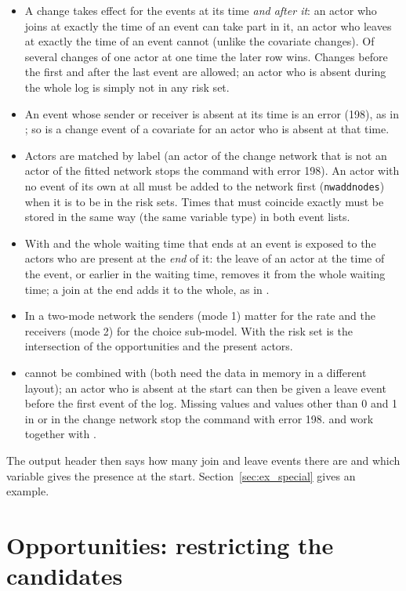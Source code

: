 \begin{itemize}[nosep]
  \item A change takes effect for the events at its time \emph{and after it}: an actor who joins at exactly the time of an event can take part in it, an actor who leaves at exactly the time of an event cannot (unlike the covariate changes). Of several changes of one actor at one time the later row wins. Changes before the first and after the last event are allowed; an actor who is absent during the whole log is simply not in any risk set.
  \item An event whose sender or receiver is absent at its time is an error (198), as in \goldfish{}; so is a change event of a covariate for an actor who is absent at that time.
  \item Actors are matched by label (an actor of the change network that is not an actor of the fitted network stops the command with error 198). An actor with no event of its own at all must be added to the network first (\texttt{nwaddnodes}) when it is to be in the risk sets. Times that must coincide exactly must be stored in the same way (the same variable type) in both event lists.
  \item With  and  the whole waiting time that ends at an event is exposed to the actors who are present at the \emph{end} of it: the leave of an actor at the time of the event, or earlier in the waiting time, removes it from the whole waiting time; a join at the end adds it to the whole, as in \goldfish{}.
  \item In a two-mode network the senders (mode 1) matter for the rate and the receivers (mode 2) for the choice sub-model. With  the risk set is the intersection of the opportunities and the present actors.
  \item {} cannot be combined with  (both need the data in memory in a different layout); an actor who is absent at the start can then be given a leave event before the first event of the log. Missing values and values other than 0 and 1 in  or in the change network stop the command with error 198.  and  work together with .
\end{itemize}
The output header then says how many join and leave events there are and which variable gives the presence at the start. Section~\ref{sec:ex_special} gives an example.

\section{Opportunities: restricting the candidates}\label{sec:opportunities}

